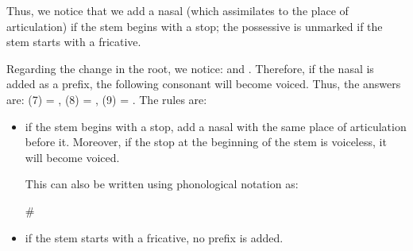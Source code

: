 \begin{refsection}
\begin{mysolution}
\begin{solutions}
Thus, we notice that we add a nasal (which assimilates to the place of
articulation) if the stem begins with a stop; the possessive is unmarked if the stem starts with a fricative.

Regarding the change in the root, we notice:  and . Therefore, if the nasal is added as a prefix, the following consonant will become voiced. Thus, the
answers are: (7) = , (8) = , (9) =
. The rules are:

\begin{itemize}
  \item if the stem begins with a stop, add a nasal with the same place of articulation before it. Moreover, if the stop at the beginning of the stem is voiceless, it will become voiced.

  This can also be written using phonological notation as:


            {}
             {\#{\longrule}}

    \item if the stem starts with a fricative, no prefix is added.
  \end{itemize}


\end{solutions}
\end{mysolution}
\end{refsection}

